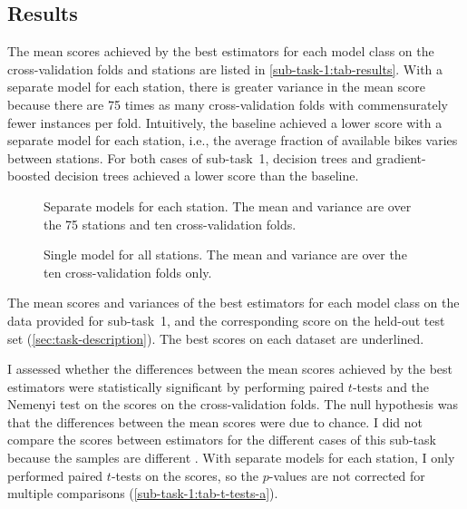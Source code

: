 \subsection{Results}
\label{sec:sub-task-1:results}

The mean scores achieved by the best estimators for each model class on the
cross-validation folds and stations are listed in \cref{sub-task-1:tab-results}.
With a separate model for each station, there is greater variance in the mean score
because there are 75 times as many cross-validation folds with commensurately fewer
instances per fold.
Intuitively, the baseline achieved a lower score with a separate model for each
station, i.e., the average fraction of available bikes varies between stations.
For both cases of sub-task~1, decision trees and gradient-boosted decision trees
achieved a lower score than the baseline.

\begin{table}
	\centering
	\begin{subfigure}{0.6\textwidth}
		\centering
		
		\caption{
			Separate models for each station.
			The mean and variance are over the 75 stations and ten cross-validation folds.
		}
		\label{sub-task-1:tab-results-a}
	\end{subfigure}
	\subfigurespace
	\begin{subfigure}{0.6\textwidth}
		\centering
		
		\caption{
			Single model for all stations.
			The mean and variance are over the ten cross-validation folds only.
		}
		\label{sub-task-1:tab-results-b}
	\end{subfigure}
	\caption{ The mean scores and variances of the best estimators for each
		model class on the data provided for sub-task~1, and the corresponding score on the
		held-out test set (\cref{sec:task-description}).
		The best scores on each dataset are underlined.
	}
	\label{sub-task-1:tab-results}
\end{table}

I assessed whether the differences between the mean scores achieved by the best
estimators were statistically significant by performing paired $t$-tests and the
Nemenyi test on the scores on the cross-validation folds.
The null hypothesis was that the differences between the mean scores were due to
chance.
I did not compare the scores between estimators for the different cases of this
sub-task because the samples are different \parencite[354]{Flach2012}.
With separate models for each station, I only performed paired $t$-tests on the scores,
so the $p$-values are not corrected for multiple comparisons
(\cref{sub-task-1:tab-t-tests-a}).

